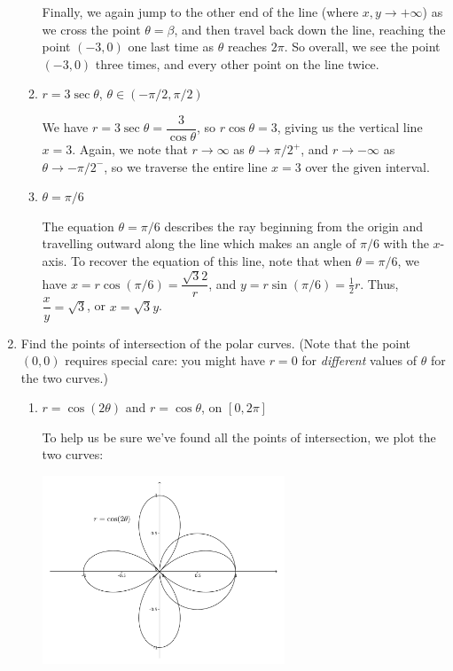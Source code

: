 \documentclass[12pt]{article}
\begin{document}
\begin{enumerate}
\begin{enumerate}
Finally, we again jump to the other end of the line (where $x,y\to +\infty$) as we cross the point $\theta=\beta$, and then travel back down the line, reaching the point $(-3,0)$ one last time as $\theta$ reaches $2\pi$. So overall, we see the point $(-3,0)$ three times, and every other point on the line twice.


 \item $r=3\sec\theta$, $\theta\in (-\pi/2,\pi/2)$

\bigskip

We have $r=3\sec\theta = \dfrac{3}{\cos\theta}$, so $r\cos\theta=3$, giving us the vertical line $x=3$. Again, we note that $r\to \infty$ as $\theta\to \pi/2^+$, and $r\to-\infty$ as $\theta\to -\pi/2^-$, so we traverse the entire line $x=3$ over the given interval.

 \item $\theta = \pi/6$

\bigskip

The equation $\theta=\pi/6$ describes the ray beginning from the origin and travelling outward along the line which makes an angle of $\pi/6$ with the $x$-axis. To recover the equation of this line, note that when $\theta=\pi/6$, we have $x=r\cos(\pi/6) = \dfrac{\sqrt{3}{2}}r$, and $y=r\sin(\pi/6) = \frac{1}{2}r$. Thus, $\dfrac{x}{y}=\sqrt{3}$, or $x=\sqrt{3}y$.

\end{enumerate}
 \item Find the points of intersection of the polar curves. (Note that the point $(0,0)$ requires special care: you might have $r=0$ for \textit{different} values of $\theta$ for the two curves.)
\begin{enumerate}
 \item $r=\cos(2\theta)$ and $r=\cos\theta$, on $[0,2\pi]$

\bigskip

To help us be sure we've found all the points of intersection, we plot the two curves:

\begin{center}
 \includegraphics[width=0.6\textwidth]{WS6-3a}
\end{center}


\end{enumerate}
\end{enumerate}
\end{document}

